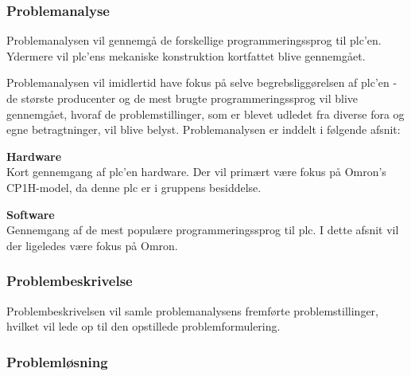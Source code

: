 \label{sec:rapportstruktur}


\subsubsection*{Problemanalyse}
Problemanalysen vil gennemgå de forskellige programmeringssprog til \gls{plc}'en. Ydermere vil \gls{plc}'ens mekaniske konstruktion kortfattet blive gennemgået. 

Problemanalysen vil imidlertid have fokus på selve begrebsliggørelsen af \gls{plc}'en - de største producenter og de mest brugte programmeringssprog vil blive gennemgået, hvoraf de problemstillinger, som er blevet udledet fra diverse fora og egne betragtninger, vil blive belyst. Problemanalysen er inddelt i følgende afsnit:

\begin{itemize_small}
    \item \textbf{Hardware} \\
    Kort gennemgang af \gls{plc}'en hardware. Der vil primært være fokus på Omron's CP1H-model, da denne \gls{plc} er i gruppens besiddelse.
    \item \textbf{Software} \\
    Gennemgang af de mest populære programmeringssprog til \gls{plc}. I dette afsnit vil der ligeledes være fokus på Omron.  
\end{itemize_small}

\subsubsection*{Problembeskrivelse}
Problembeskrivelsen vil samle problemanalysens fremførte problemstillinger, hvilket vil lede op til den opstillede problemformulering.

\subsubsection*{Problemløsning}

